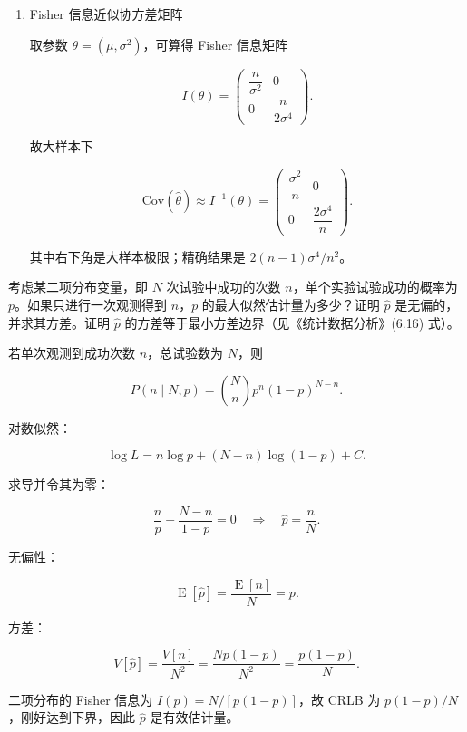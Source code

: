 \begin{question}
\begin{solution}
\begin{enumerate}
而第五章已知 \(\operatorname{E}[s^2]=\sigma^2\)，高斯情形下

\[
V[s^2]=\frac{2\sigma^4}{n-1},
\]

所以

\[
\operatorname{E}[\hat\sigma^2]=\frac{n-1}{n}\sigma^2,
\qquad
V[\hat\sigma^2]=\left(\frac{n-1}{n}\right)^2\frac{2\sigma^4}{n-1}
=\frac{2(n-1)}{n^2}\sigma^4.
\]

\item Fisher 信息近似协方差矩阵

取参数 \(\theta=(\mu,\sigma^2)\)，可算得 Fisher 信息矩阵

\[
I(\theta)=
\begin{pmatrix}
\dfrac{n}{\sigma^2} & 0\\[4pt]
0 & \dfrac{n}{2\sigma^4}
\end{pmatrix}.
\]

故大样本下

\[
\mathrm{Cov}(\hat\theta)\approx I^{-1}(\theta)=
\begin{pmatrix}
\dfrac{\sigma^2}{n} & 0\\[4pt]
0 & \dfrac{2\sigma^4}{n}
\end{pmatrix}.
\]

其中右下角是大样本极限；精确结果是 \(2(n-1)\sigma^4/n^2\)。
\end{enumerate}
\end{solution}
\end{question}


\begin{question}
考虑某二项分布变量，即 \(N\) 次试验中成功的次数
\(n\)，单个实验试验成功的概率为 \(p\)。如果只进行一次观测得到
\(n\)，\(p\) 的最大似然估计量为多少？证明 \(\hat p\)
是无偏的，并求其方差。证明 \(\hat p\)
的方差等于最小方差边界（见《统计数据分析》(6.16) 式）。
\begin{solution}
若单次观测到成功次数 \(n\)，总试验数为 \(N\)，则

\[
P(n\mid N,p)=\binom Nn p^n(1-p)^{N-n}.
\]

对数似然：

\[
\log L=n\log p+(N-n)\log(1-p)+C.
\]

求导并令其为零：

\[
\frac{n}{p}-\frac{N-n}{1-p}=0
\quad\Rightarrow\quad
\hat p=\frac nN.
\]

无偏性：

\[
\operatorname{E}[\hat p]=\frac{\operatorname{E}[n]}{N}=p.
\]

方差：

\[
V[\hat p]=\frac{V[n]}{N^2}=\frac{Np(1-p)}{N^2}=\frac{p(1-p)}{N}.
\]

二项分布的 Fisher 信息为 \(I(p)=N/[p(1-p)]\)，故 CRLB 为
\(p(1-p)/N\)，刚好达到下界，因此 \(\hat p\) 是有效估计量。
\end{solution}
\end{question}


